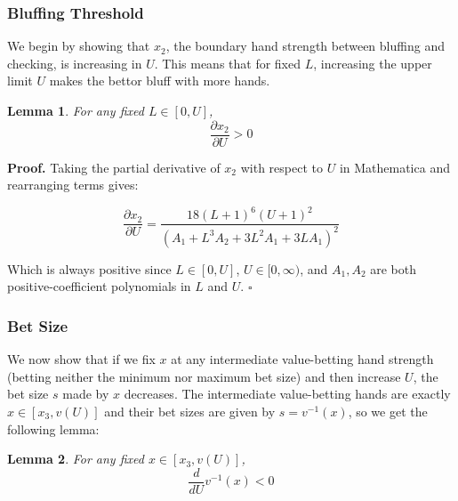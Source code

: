 \documentclass[a4paper,12pt]{article}
\theoremstyle{plain}
\newtheorem{lemma}{Lemma}[section]
\theoremstyle{definition}
\newenvironment{customproof}[1][Proof]{\noindent\textbf{#1.} }{\hfill$\square$\vspace{1em}}
\begin{document}
\subsubsection{Bluffing Threshold}

We begin by showing that $x_2$, the boundary hand strength between bluffing and checking, is increasing in $U$. This means that for fixed $L$, increasing the upper limit $U$ makes the bettor bluff with more hands. 

\begin{lemma}
    \label{lem:x2_increasing}
    For any fixed $L \in [0, U]$,
    $$ \frac{\partial x_2}{\partial U} > 0 $$
\end{lemma}

\begin{customproof}
    Taking the partial derivative of $x_2$ with respect to $U$ in Mathematica and rearranging terms gives:
    
    $$\frac{\partial x_2}{\partial U} = \frac{18 (L+1)^6 (U+1)^2}{\left(A_1 + L^3 A_2 + 3 L^2 A_1 + 3 L A_1 \right)^2}$$

    Which is always positive since $L \in [0, U]$, $U \in [0, \infty)$, and $A_1, A_2$ are both positive-coefficient polynomials in $L$ and $U$.   
\end{customproof}

\subsubsection{Bet Size}

We now show that if we fix $x$ at any intermediate value-betting hand strength (betting neither the minimum nor maximum bet size) and then increase $U$, the bet size $s$ made by $x$ decreases. The intermediate value-betting hands are exactly $x \in [x_3, v(U)]$ and their bet sizes are given by $s = v^{-1}(x)$, so we get the following lemma:

\begin{lemma}
    \label{lem:v_inverse_decreasing}
    For any fixed $x \in [x_3, v(U)]$, 
    \[ 
        \frac{d}{dU} v^{-1}(x) < 0
    \]
\end{lemma}
\end{document}
